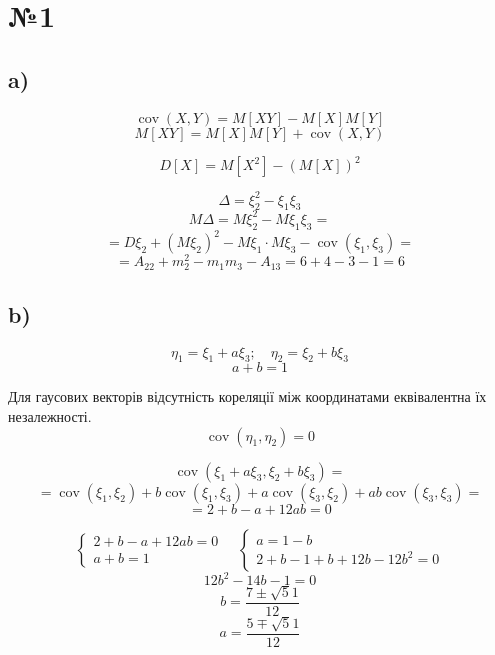 \documentclass[11pt, a4paper]{article} %
\DeclareMathOperator{\cov}{cov}
\begin{document}
\section*{№1}

\subsection*{a)}
$$\cov(X, Y) = M[XY] - M[X]M[Y]$$
$$M[XY] = M[X]M[Y] + \cov(X, Y)$$

$$D[X] = M[X^2] - (M[X])^2$$

$$\Delta = \xi_2^2 - \xi_1\xi_3$$
$$M\Delta = M\xi_2^2 - M\xi_1\xi_3 = $$
$$= D\xi_2 + \left(M\xi_2\right)^2 - M\xi_1 \cdot M\xi_3 - \cov(\xi_1,\xi_3) = $$
$$= A_{22} + m_2^2 - m_1m_3 - A_{13} = 6 + 4 - 3 - 1 = 6$$

\subsection*{b)}
$$\eta_1 = \xi_1 + a\xi_3;\quad \eta_2 = \xi_2 + b \xi_3$$
$$a+b = 1$$







Для гаусових векторів відсутність кореляції між координатами еквівалентна їх незалежності.
$$\cov(\eta_1, \eta_2) = 0$$

$$\cov(\xi_1 + a\xi_3, \xi_2 + b\xi_3) = $$
$$= \cov(\xi_1, \xi_2) + b \cov(\xi_1, \xi_3) + a \cov(\xi_3, \xi_2) + ab\cov(\xi_3, \xi_3) = $$
$$= 2 + b - a + 12 ab = 0$$

$$\begin{cases}
    2 + b - a + 12 ab = 0 \\
    a + b = 1
\end{cases} \quad 
\begin{cases}
    a = 1 - b \\
    2 + b - 1 + b + 12 b - 12 b^2 = 0
\end{cases}$$
$$12b^2 - 14b - 1 = 0$$
$$b = \frac{7 \pm \sqrt 51}{12}$$
$$a = \frac{5 \mp \sqrt 51}{12}$$
\pagebreak
\end{document}
